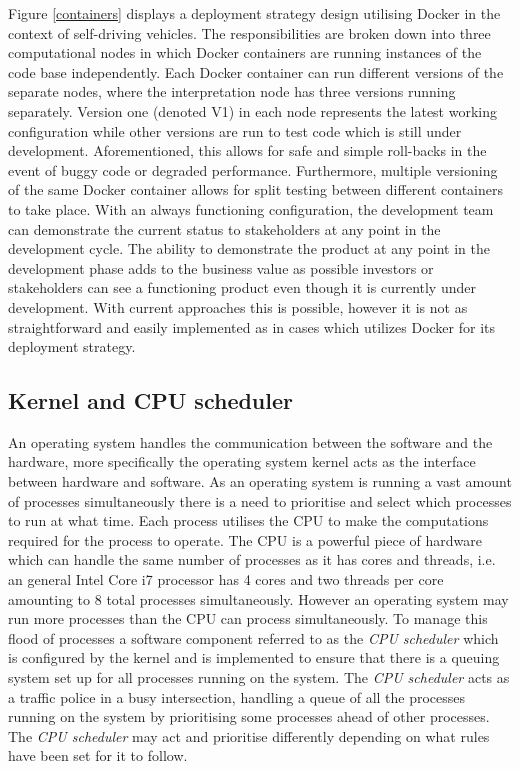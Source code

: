 Figure \ref{containers} displays a deployment strategy design utilising Docker in the context of self-driving vehicles. The responsibilities are broken down into three computational nodes in which Docker containers are running instances of the code base independently. Each Docker container can run different versions of the separate nodes, where the interpretation node has three versions running separately. Version one (denoted V1) in each node represents the latest working configuration while other versions are run to test code which is still under development. Aforementioned, this allows for safe and simple roll-backs in the event of buggy code or degraded performance. Furthermore, multiple versioning of the same Docker container allows for split testing between different containers to take place. With an always functioning configuration, the development team can demonstrate the current status to stakeholders at any point in the development cycle. The ability to demonstrate the product at any point in the development phase adds to the business value as possible investors or stakeholders can see a functioning product even though it is currently under development. With current approaches this is possible, however it is not as straightforward and easily implemented as in cases which utilizes Docker for its deployment strategy.\\

\subsection{Kernel and CPU scheduler}

An operating system handles the communication between the software and the hardware, more specifically the operating system kernel acts as the interface between hardware and software. As an operating system is running a vast amount of processes simultaneously there is a need to prioritise and select which processes to run at what time. Each process utilises the CPU to make the computations required for the process to operate. The CPU is a powerful piece of hardware which can handle the same number of processes as it has cores and threads, i.e. an general Intel Core i7 processor has 4 cores and two threads per core amounting to 8 total processes simultaneously. However an operating system may run more processes than the CPU can process simultaneously. To manage this flood of processes a software component referred to as the \textit{CPU scheduler} which is configured by the kernel and is implemented to ensure that there is a queuing system set up for all processes running on the system. The \textit{CPU scheduler} acts as a traffic police in a busy intersection, handling a queue of all the processes running on the system by prioritising some processes ahead of other processes. The \textit{CPU scheduler} may act and prioritise differently depending on what rules have been set for it to follow.\\

